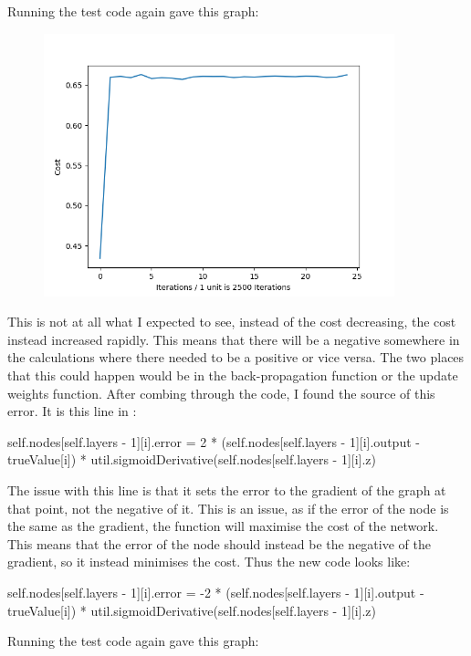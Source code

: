 \documentclass{report}
\begin{document}
Running the test code again gave this graph:
\begin{figure}[H]
    \centering
    \includegraphics[width = 4in]{Images/Development and Testing/Stage 3/Inverted Training Curve.png} 
    \label{fig:Inverted Cost Graph}
\end{figure}
\noindent This is not at all what I expected to see, instead of the cost decreasing, the cost instead increased rapidly. This means that there will be a negative somewhere in the calculations where there needed to be a positive or vice versa. The two places that this could happen would be in the back-propagation function or the update weights function.
\newline
After combing through the code, I found the source of this error. It is this line in :
\begin{python}
self.nodes[self.layers - 1][i].error = 2 * (self.nodes[self.layers - 1][i].output - trueValue[i]) * util.sigmoidDerivative(self.nodes[self.layers - 1][i].z) 
\end{python}
The issue with this line is that it sets the error to the gradient of the graph at that point, not the negative of it. This is an issue, as if the error of the node is the same as the gradient, the function will maximise the cost of the network. This means that the error of the node should instead be the negative of the gradient, so it instead minimises the cost. Thus the new code looks like:
\begin{python}
self.nodes[self.layers - 1][i].error = -2 * (self.nodes[self.layers - 1][i].output - trueValue[i]) * util.sigmoidDerivative(self.nodes[self.layers - 1][i].z) 
\end{python}
Running the test code again gave this graph:
\end{document}
